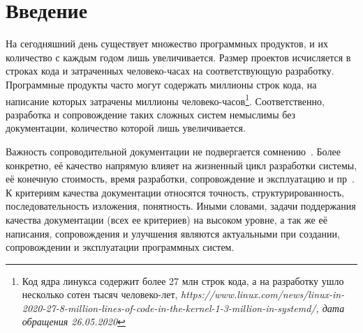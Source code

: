 \section*{Введение}


На сегодняшний день существует множество программных продуктов, и их количество с каждым годом лишь увеличивается.
Размер проектов исчисляется в строках кода и затраченных человеко-часах на соответствующую разработку.
Программные продукты часто могут содержать миллионы строк кода, на написание которых затрачены миллионы человеко-часов\footnote{Код ядра линукса содержит более 27 млн строк кода, а на разработку ушло несколько сотен тысяч человеко-лет, \emph{https://www.linux.com/news/linux-in-2020-27-8-million-lines-of-code-in-the-kernel-1-3-million-in-systemd/, дата обращения 26.05.2020}}.
Соответственно, разработка и сопровождение таких сложных систем немыслимы без документации, количество которой лишь увеличивается.

Важность сопроводительной документации не подвергается сомнению~\cite{kipyegen2013importance,chomal2014significance}.
Более конкретно, её качество напрямую влияет на жизненный цикл разработки системы, её конечную стоимость, время разработки, сопровождение и эксплуатацию и пр~\cite{plosch2014value}. 
К критериям качества документации относятся точность, структурированность, последовательность изложения, понятность.
Иными словами, задачи поддержания качества документации (всех ее критериев) на высоком уровне, а так же её написания, сопровождения и улучшения являются актуальными при создании, сопровождении и эксплуатации программных систем.

